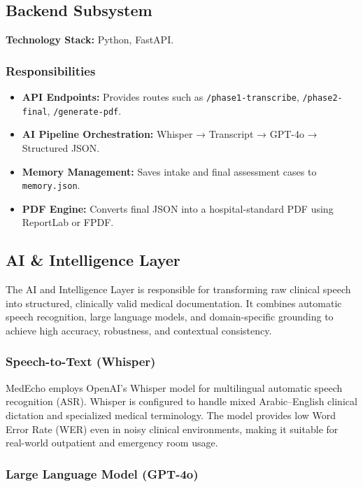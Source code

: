 \subsection{Backend Subsystem}
\label{sec:design:backend}

\textbf{Technology Stack:} Python, FastAPI.

\subsubsection*{Responsibilities}
\begin{itemize}
    \item \textbf{API Endpoints:} Provides routes such as \texttt{/phase1-transcribe}, 
          \texttt{/phase2-final}, \texttt{/generate-pdf}.
    \item \textbf{AI Pipeline Orchestration:} 
          Whisper → Transcript → GPT-4o → Structured JSON.
    \item \textbf{Memory Management:} Saves intake and final assessment cases to \texttt{memory.json}.
    \item \textbf{PDF Engine:} Converts final JSON into a hospital-standard PDF using 
          ReportLab or FPDF.
\end{itemize}

\subsection{AI \& Intelligence Layer}
\label{sec:design:ai}

The AI and Intelligence Layer is responsible for transforming raw clinical speech into structured, clinically valid medical documentation. It combines automatic speech recognition, large language models, and domain-specific grounding to achieve high accuracy, robustness, and contextual consistency.

\subsubsection*{Speech-to-Text (Whisper)}

MedEcho employs OpenAI’s Whisper model for multilingual automatic speech recognition (ASR). Whisper is configured to handle mixed Arabic--English clinical dictation and specialized medical terminology. The model provides low Word Error Rate (WER) even in noisy clinical environments, making it suitable for real-world outpatient and emergency room usage.

\subsubsection*{Large Language Model (GPT-4o)}

